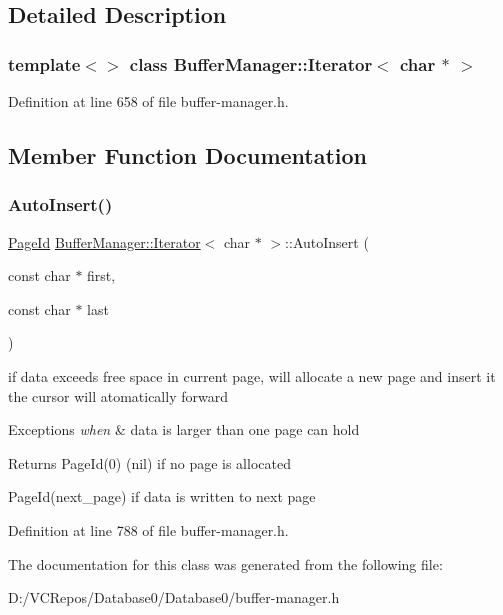 \subsection{Detailed Description}
\subsubsection*{template$<$$>$\newline
class Buffer\+Manager\+::\+Iterator$<$ char $\ast$ $>$}



Definition at line 658 of file buffer-\/manager.\+h.



\subsection{Member Function Documentation}
\mbox{\label{class_buffer_manager_1_1_iterator_3_01char_01_5_01_4_a21992fa80761bab5fa8a32f000f2366a}} 
\subsubsection{\texorpdfstring{AutoInsert()}{AutoInsert()}}
{\footnotesize\ttfamily \mbox{\hyperlink{struct_generic_i_o_id}{Page\+Id}} \mbox{\hyperlink{class_buffer_manager_1_1_iterator}{Buffer\+Manager\+::\+Iterator}}$<$ char $\ast$ $>$\+::Auto\+Insert (\begin{DoxyParamCaption}\item[{const char $\ast$}]{first,  }\item[{const char $\ast$}]{last }\end{DoxyParamCaption})\hspace{0.3cm}{\ttfamily [inline]}}

if data exceeds free space in current page, will allocate a new page and insert it the cursor will atomatically forward 
\begin{DoxyExceptions}{Exceptions}
{\em when} & data is larger than one page can hold \\
\hline
\end{DoxyExceptions}
\begin{DoxyReturn}{Returns}
{\ttfamily Page\+Id(0)} (nil) if no page is allocated 

{\ttfamily Page\+Id(next\+\_\+page)} if data is written to next page 
\end{DoxyReturn}


Definition at line 788 of file buffer-\/manager.\+h.



The documentation for this class was generated from the following file\+:\begin{DoxyCompactItemize}
\item 
D\+:/\+V\+C\+Repos/\+Database0/\+Database0/buffer-\/manager.\+h\end{DoxyCompactItemize}
